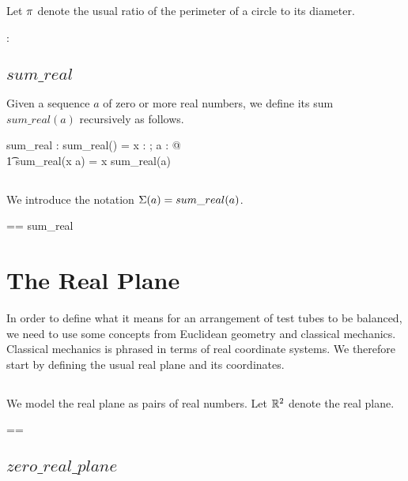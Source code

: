 \documentclass{amsart}
\begin{document}
Let $\pi$ denote the usual ratio of the perimeter of a circle to its diameter.

\begin{axdef}
	\piR : \R
\end{axdef}

\subsection{$sum\_real$}

Given a sequence $a$ of zero or more real numbers,
we define its sum $sum\_real(a)$ recursively as follows.

\begin{axdef}
	sum\_real : \seq \R \fun \R
\where
	sum\_real(\langle \rangle) = \zeroR
\also
	\forall x : \R; a : \seq \R @ \\
	\t1	sum\_real(\langle x \rangle \cat a) = x \addR sum\_real(a)
\end{axdef}

\subsection{}

We introduce the notation $\Sigma(a) = sum\_real(a)$.

\begin{zed}
	\sumR == sum\_real
\end{zed}

\section{The Real Plane}

In order to define what it means for an arrangement of test tubes to be balanced,
we need to use some concepts from Euclidean geometry and classical mechanics.
Classical mechanics is phrased in terms of real coordinate systems.
We therefore start by defining the usual real plane and its coordinates.

\subsection{}

We model the real plane as pairs of real numbers.
Let $\mathbb{R}^2$ denote the real plane.

\begin{zed}
	\Rtwo == \R \cross \R
\end{zed}

\subsection{$zero\_real\_plane$}
\end{document}
